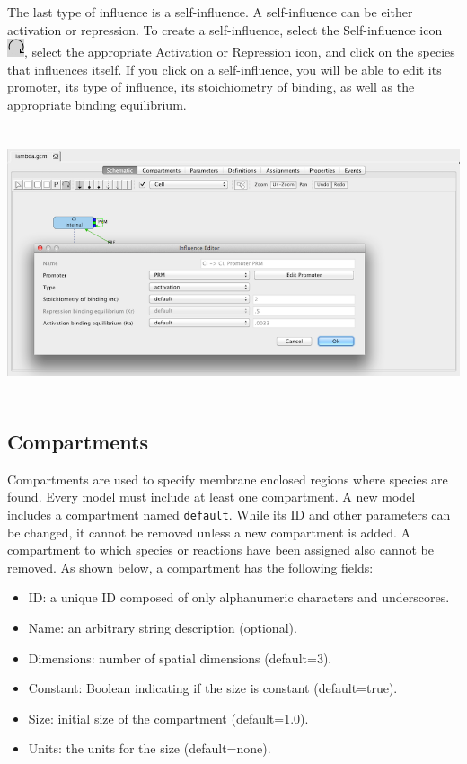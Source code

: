 \documentclass[titlepage,11pt]{article}
\begin{document}
The last type of influence is a self-influence.  A self-influence can be either activation or repression.  To create a self-influence, select the Self-influence icon \includegraphics{../gui/icons/modelview/self_influence_selected}, select the appropriate Activation or Repression icon, and click on the species that influences itself.  If you click on a self-influence, you will be able to edit its promoter, its type of influence, its stoichiometry of binding, as well as the appropriate binding equilibrium. 

\begin{center}
\includegraphics[height=80mm]{screenshots/selfInfluence}
\end{center}

\subsection{\label{Compartments}Compartments}

\noindent
Compartments are used to specify membrane enclosed regions where species are found. Every model must include at least one compartment. A new model includes a compartment named {\tt default}.  While its ID and other parameters can be changed, it cannot be removed unless a new compartment is added.  A compartment to which species or reactions have been assigned also cannot be removed.  
As shown below, a compartment has the following fields:
\begin{itemize}
\item ID: a unique ID composed of only alphanumeric characters and underscores.
\item Name: an arbitrary string description (optional).
\item Dimensions: number of spatial dimensions (default=3).
\item Constant: Boolean indicating if the size is constant (default=true).
\item Size: initial size of the compartment (default=1.0).
\item Units: the units for the size (default=none).
\end{itemize}
\end{document}
